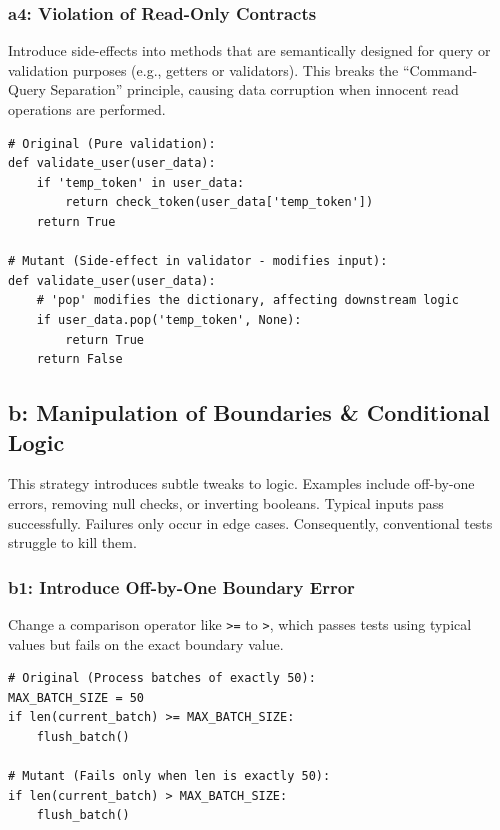 \documentclass[11pt]{article}
\begin{document}
\subsubsection*{a4: Violation of Read-Only Contracts}
Introduce side-effects into methods that are semantically designed for query or validation purposes (e.g., getters or validators). This breaks the ``Command-Query Separation'' principle, causing data corruption when innocent read operations are performed.

\begin{listing}[H]
\begin{verbatim}
# Original (Pure validation):
def validate_user(user_data):
    if 'temp_token' in user_data:
        return check_token(user_data['temp_token'])
    return True

# Mutant (Side-effect in validator - modifies input):
def validate_user(user_data):
    # 'pop' modifies the dictionary, affecting downstream logic
    if user_data.pop('temp_token', None): 
        return True
    return False
\end{verbatim}
\caption{a4: Implicit side-effects in read-only methods}
\label{code:a4}
\end{listing}

\subsection*{b: Manipulation of Boundaries \& Conditional Logic}
This strategy introduces subtle tweaks to logic. Examples include off-by-one errors, removing null checks, or inverting booleans. Typical inputs pass successfully. Failures only occur in edge cases. Consequently, conventional tests struggle to kill them.

\subsubsection*{b1: Introduce Off-by-One Boundary Error}
Change a comparison operator like \texttt{>=} to \texttt{>}, which passes tests using typical values but fails on the exact boundary value.

\begin{listing}[H]
\begin{verbatim}
# Original (Process batches of exactly 50):
MAX_BATCH_SIZE = 50
if len(current_batch) >= MAX_BATCH_SIZE:
    flush_batch()

# Mutant (Fails only when len is exactly 50):
if len(current_batch) > MAX_BATCH_SIZE:
    flush_batch()
\end{verbatim}
\caption{b1: Off-by-one error in batch processing}
\label{code:b1}
\end{listing}
\end{document}
